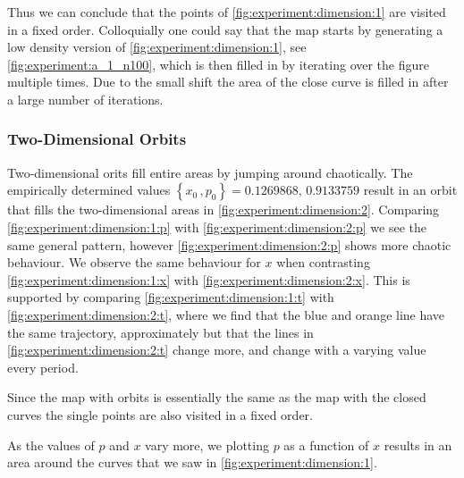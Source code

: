 Thus we can conclude that the points of \cref{fig:experiment:dimension:1} are visited in a fixed order. Colloquially one could say that the map starts by generating a low density version of \cref{fig:experiment:dimension:1}, see \cref{fig:experiment:a_1_n100}, which is then filled in by iterating over the figure multiple times. Due to the small shift the area of the close curve is filled in after a large number of iterations.

\subsubsection{Two-Dimensional Orbits}	
\label{sss:experiment:a:2D}
	Two-dimensional orits fill entire areas by jumping around chaotically. The empirically determined values $\left\{x_0\,, p_0 \right\} = {\num{0.1269868},\,\num{0.9133759}}$ result in an orbit that fills the two-dimensional areas in \cref{fig:experiment:dimension:2}. Comparing \cref{fig:experiment:dimension:1:p} with \cref{fig:experiment:dimension:2:p} we see the same general pattern, however \cref{fig:experiment:dimension:2:p} shows more chaotic behaviour. We observe the same behaviour for $x$ when contrasting \cref{fig:experiment:dimension:1:x} with \cref{fig:experiment:dimension:2:x}. This is supported by comparing \cref{fig:experiment:dimension:1:t} with \cref{fig:experiment:dimension:2:t}, where we find that the blue and orange line have the same trajectory, approximately but that the lines in \cref{fig:experiment:dimension:2:t} change more, and change with a varying value every period.

	Since the map with orbits is essentially the same as the map with the closed curves the single points are also visited in a fixed order. 

	As the values of $p$ and $x$ vary more, we plotting $p$ as a function of $x$ results in an area around the curves that we saw in \cref{fig:experiment:dimension:1}.


